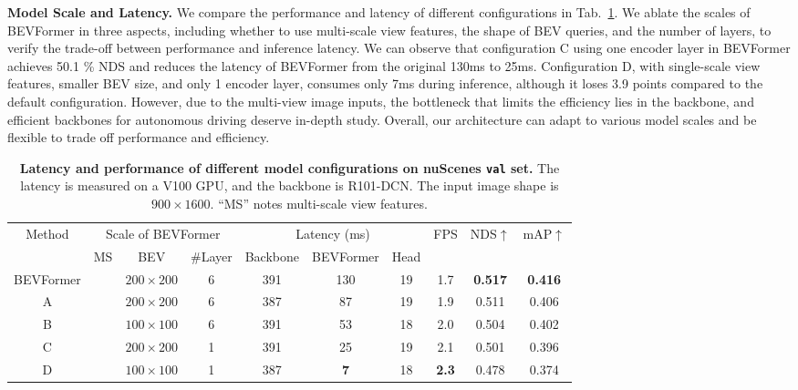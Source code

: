 \documentclass{article}
\newcommand{\cmark}{\ding{51}}\newcommand{\xmark}{\ding{55}}\definecolor{gray9}{gray}{.9}
\begin{document}
\noindent\textbf{Model Scale and Latency.} We compare the performance and latency of different configurations in Tab.~\ref{table:latency}. We ablate the scales of BEVFormer in three aspects, including whether to use multi-scale view features, the shape of BEV queries, and the number of layers, to verify the trade-off between performance and inference latency. We can observe that configuration C using one encoder layer in BEVFormer achieves 50.1 \% NDS and reduces the latency of  BEVFormer from the original 130ms to 25ms. Configuration D, with single-scale view features, smaller BEV size, and only 1 encoder layer, consumes only 7ms during inference, although it loses 3.9 points compared to the default configuration. However, due to the multi-view image inputs, the bottleneck that limits the efficiency lies in the backbone, and efficient backbones for autonomous driving deserve in-depth study.
Overall, our architecture can adapt to various model scales and be flexible to trade off performance and efficiency.





\begin{table}[t] 
\begin{center}

\caption{
\textbf{Latency and performance of different model configurations on nuScenes \texttt{val} set.} The latency is measured on a V100 GPU, and the backbone is R101-DCN. The input image shape is $900\!\times\!1600$. ``MS'' notes multi-scale view features.
}
\setlength{\tabcolsep}{1.4mm}
\begin{tabular}{c| c c c | c c  c|c | c c}
\toprule
\multirow{2}{*}{Method}&
\multicolumn{3}{c|}{Scale of BEVFormer}
 &  \multicolumn{3}{c|}{Latency (ms)}&  \multirow{2}{*}{FPS} &\multirow{2}{*}{NDS$\uparrow$} &\multirow{2}{*}{mAP$\uparrow$}\\
&MS&BEV&\#Layer& Backbone & BEVFormer & Head&\\
\midrule
BEVFormer & \cmark&$200\!\times\!200$ & 6 &391 & 130& 19 &1.7&\textbf{0.517}&\textbf{0.416}\\
\midrule
A & \xmark&$200\!\times\!200$ & 6 & 387& 87& 19&1.9&0.511&0.406\\
B & \cmark&$100\!\times\!100$ & 6 & 391& 53& 18&2.0&0.504&0.402\\
C & \cmark&$200\!\times\!200$ & 1 & 391& 25& 19&2.1&0.501&0.396\\
D & \xmark&$100\!\times\!100$ & 1 & 387& \textbf{7}& 18&\textbf{2.3}&0.478&0.374\\
\bottomrule

\end{tabular} \label{table:latency}
\end{center}
\end{table}
\end{document}
